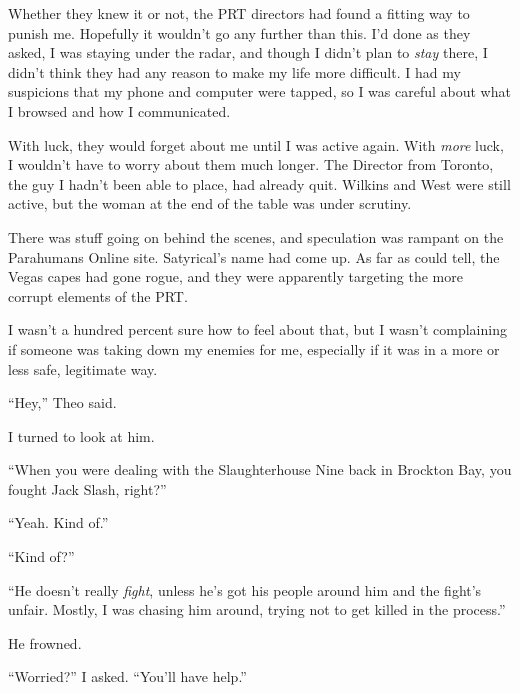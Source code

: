 Whether they knew it or not, the PRT directors had found a fitting way to punish me.  Hopefully it wouldn't go any further than this.  I'd done as they asked, I was staying under the radar, and though I didn't plan to \emph{stay} there, I didn't think they had any reason to make my life more difficult.  I had my suspicions that my phone and computer were tapped, so I was careful about what I browsed and how I communicated.



With luck, they would forget about me until I was active again.  With \emph{more} luck, I wouldn't have to worry about them much longer.  The Director from Toronto, the guy I hadn't been able to place, had already quit.  Wilkins and West were still active, but the woman at the end of the table was under scrutiny.



There was stuff going on behind the scenes, and speculation was rampant on the Parahumans Online site.  Satyrical's name had come up.  As far as  could tell, the Vegas capes had gone rogue, and they were apparently targeting the more corrupt elements of the PRT.



I wasn't a hundred percent sure how to feel about that, but I wasn't complaining if someone was taking down my enemies for me, especially if it was in a more or less safe, legitimate way.



``Hey,'' Theo said.



I turned to look at him.



``When you were dealing with the Slaughterhouse Nine back in Brockton Bay, you fought Jack Slash, right?''



``Yeah.  Kind of.''



``Kind of?''



``He doesn't really \emph{fight}, unless he's got his people around him and the fight's unfair.  Mostly, I was chasing him around, trying not to get killed in the process.''



He frowned.



``Worried?'' I asked.  ``You'll have help.''



